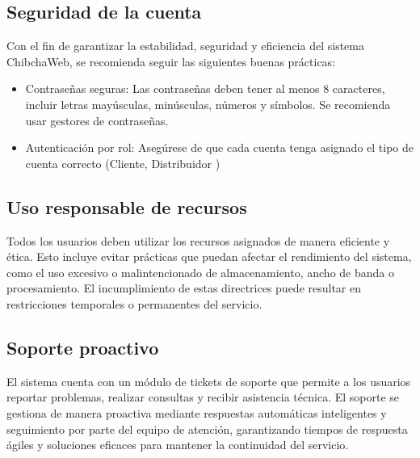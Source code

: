 \subsection{Seguridad de la cuenta}
Con el fin de garantizar la estabilidad, seguridad y eficiencia del sistema ChibchaWeb, se recomienda seguir las siguientes buenas prácticas:

\begin{itemize}
\item Contraseñas seguras: Las contraseñas deben tener al menos 8 caracteres, incluir letras mayúsculas, minúsculas, números y símbolos. Se recomienda usar gestores de contraseñas.

\item Autenticación por rol: Asegúrese de que cada cuenta tenga asignado el tipo de cuenta correcto (Cliente, Distribuidor )
\end{itemize}

\subsection{Uso responsable de recursos}
Todos los usuarios deben utilizar los recursos asignados de manera eficiente y ética. Esto incluye evitar prácticas que puedan afectar el rendimiento del sistema, como el uso excesivo o malintencionado de almacenamiento, ancho de banda o procesamiento. El incumplimiento de estas directrices puede resultar en restricciones temporales o permanentes del servicio.

\subsection{Soporte proactivo}
El sistema cuenta con un módulo de tickets de soporte que permite a los usuarios reportar problemas, realizar consultas y recibir asistencia técnica. El soporte se gestiona de manera proactiva mediante respuestas automáticas inteligentes y seguimiento por parte del equipo de atención, garantizando tiempos de respuesta ágiles y soluciones eficaces para mantener la continuidad del servicio.
